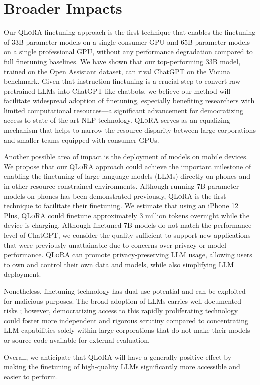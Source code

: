 \section{Broader Impacts}

Our \textsc{QLoRA} finetuning approach is the first technique that enables the finetuning of 33B-parameter models on a single consumer GPU and 65B-parameter models on a single professional GPU, without any performance degradation compared to full finetuning baselines. We have shown that our top-performing 33B model, trained on the Open Assistant dataset, can rival ChatGPT on the Vicuna benchmark. Given that instruction finetuning is a crucial step to convert raw pretrained LLMs into ChatGPT-like chatbots, we believe our method will facilitate widespread adoption of finetuning, especially benefiting researchers with limited computational resources—a significant advancement for democratizing access to state-of-the-art NLP technology. \textsc{QLoRA} serves as an equalizing mechanism that helps to narrow the resource disparity between large corporations and smaller teams equipped with consumer GPUs.

Another possible area of impact is the deployment of models on mobile devices. We propose that our \textsc{QLoRA} approach could achieve the important milestone of enabling the finetuning of large language models (LLMs) directly on phones and in other resource-constrained environments. Although running 7B parameter models on phones has been demonstrated previously, \textsc{QLoRA} is the first technique to facilitate their finetuning. We estimate that using an iPhone 12 Plus, \textsc{QLoRA} could finetune approximately 3 million tokens overnight while the device is charging. Although finetuned 7B models do not match the performance level of ChatGPT, we consider the quality sufficient to support new applications that were previously unattainable due to concerns over privacy or model performance. \textsc{QLoRA} can promote privacy-preserving LLM usage, allowing users to own and control their own data and models, while also simplifying LLM deployment.

Nonetheless, finetuning technology has dual-use potential and can be exploited for malicious purposes. The broad adoption of LLMs carries well-documented risks \citep{bommasani2021opportunities,bender2021dangers}; however, democratizing access to this rapidly proliferating technology could foster more independent and rigorous scrutiny compared to concentrating LLM capabilities solely within large corporations that do not make their models or source code available for external evaluation.

Overall, we anticipate that \textsc{QLoRA} will have a generally positive effect by making the finetuning of high-quality LLMs significantly more accessible and easier to perform.

